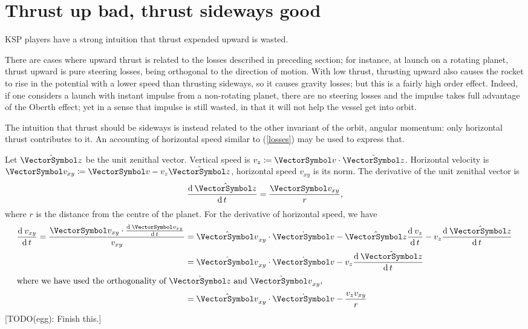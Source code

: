 \documentclass[10pt, a4paper, twoside]{basestyle}
\begin{document}
\section{Thrust up bad, thrust sideways good}
KSP players have a strong intuition that thrust expended upward is wasted.

There are cases where upward thrust is related to the losses described in preceding section;
for instance, at launch on a rotating planet, thrust upward is pure steering losses, being
orthogonal to the direction of motion.
With low thrust, thrusting upward also causes the rocket to rise in the potential with a
lower speed than thrusting sideways, so it causes gravity losses; but this is a fairly
high order effect.
Indeed, if one considers a launch with instant impulse from a non-rotating planet,
there are no steering losses and the impulse takes full advantage of the Oberth effect;
yet in a sense that impulse is still wasted,
in that it will not help the vessel get into orbit.

The intuition that thrust should be sideways is instead related to the other invariant of the orbit,
angular momentum: only horizontal thrust contributes to it.
An accounting of horizontal speed similar to (\ref{losses}) may be used to express that.

Let $\hat{\vz}$ be the unit zenithal vector.
Vertical speed is $v_z\DefineAs\scal{\vv}{\hat{\vz}}$.
Horizontal velocity is $\vv_{xy}\DefineAs\vv-v_z\hat{\vz}$,
horizontal speed $v_{xy}$ is its norm.
The derivative of the unit zenithal vector is\[
\deriv t {\hat{\vz}} = \frac{\vv_{xy}}{r}\text,
\]
where $r$ is the distance from the centre of the planet.
For the derivative of horizontal speed, we have
\begin{align*}
\deriv t {v_{xy}}
= \frac{\scal{\vv_{xy}}{\deriv t {\vv_{xy}}}}{v_{xy}}
&= \scal{\hat{\vv}_{xy}}{\pascal{\TimeDerivative\vv-\hat{\vz}\deriv t {v_z} - v_z \deriv t{\hat{\vz}}}}\\
&= \scal{\hat{\vv}_{xy}}{\pascal{\TimeDerivative\vv- v_z \deriv t{\hat{\vz}}}}\\
\intertext{where we have used the orthogonality of $\hat{\vz}$ and $\hat{\vv}_{xy}$,}
&= \scal{\hat{\vv}_{xy}}{\TimeDerivative\vv}- \frac{v_zv_{xy}}{r}\\
\end{align*}
[TODO(egg): Finish this.]
\end{document}
